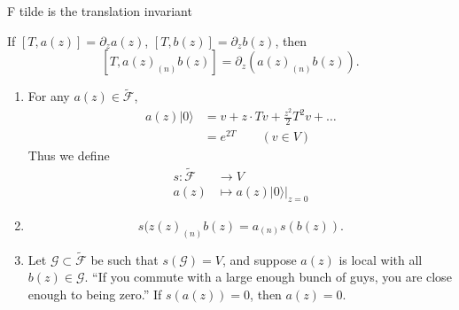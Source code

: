 F tilde is the translation invariant
\begin{exercise}
\label{exercise-Fbar-subset-Ftilde}
If $[T,a(z)]=\partial_za(z)$,
$[T,b(z)]=\partial_zb(z)$,
then
$$
[T,a(z)_{(n)}b(z)]=\partial_z(a(z)_{(n)}b(z))
.
$$
\end{exercise}

\begin{theorem}
\label{theorem-}
\begin{enumerate}
\item For any $a(z) \in \tilde{\mathcal{F}}$,
\label{item-verte-algeb-secon-defin-1}
$$
\begin{aligned}
a(z)|0\rangle&=v+z\cdot
Tv+\frac{z^2}{2}T^2v+\ldots\\
&=e^{2T}\qquad (v\in V)
\end{aligned}
$$
Thus we define
$$
\begin{aligned}
s: \tilde{\mathcal{F}} &\longrightarrow V \\
a(z) &\longmapsto a(z)|0\rangle|_{z=0}
\end{aligned}
$$

\item
\label{item-verte-algeb-secon-defin-2}
$$
s(z(z)_{(n)}b(z)=a_{(n)}s(b(z)).
$$
\item Let $\mathcal{G} \subset
\tilde{\mathcal{F}}$ be
\label{item-verte-algeb-secon-defin-3}
such that $s(\mathcal{G})=V$, and suppose
$a(z)$ is local with all $b(z) \in
\mathcal{G}$.
``If you commute with a large enough bunch of
guys,
you are close enough to being zero.''
If $s(a(z))=0$, then $a(z)=0$.
\end{enumerate}
\end{theorem}

